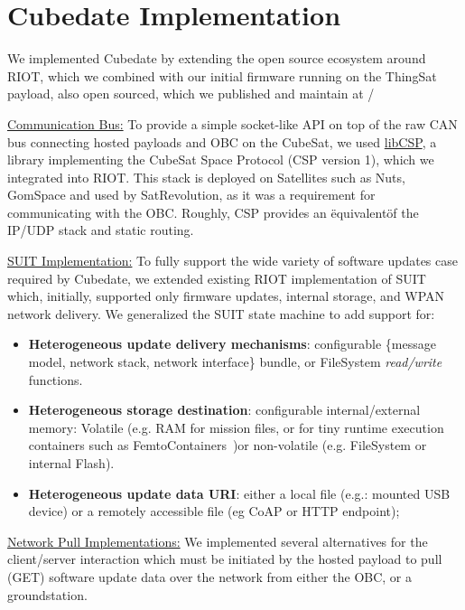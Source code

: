 \section{Cubedate Implementation}
\label{sec:implementation}

We implemented Cubedate by extending the open source ecosystem around RIOT, which we combined with
our initial firmware running on the ThingSat payload, also open sourced, which we published and
maintain at \cite*{git:cubedate-repo}/

\underline{Communication Bus:}
To provide a simple socket-like API on top of the raw CAN bus connecting hosted
payloads and OBC on the CubeSat, we used \href{https://github.com/libcsp/libcsp}{libCSP},
a library implementing the CubeSat Space Protocol (CSP version 1), which we integrated into RIOT.
This stack is deployed on Satellites such as Nuts\cite{birkeland2014nutsoverview}, GomSpace
and used by SatRevolution, as it was a requirement for communicating with the OBC.
Roughly, CSP provides an \"equivalent\" of the IP/UDP stack and static routing.

\underline{SUIT Implementation:}
To fully support the wide variety of software updates case required by Cubedate, we
extended existing RIOT implementation of SUIT~\cite{zandberg2019secure} which,
initially, supported only firmware updates, internal storage, and WPAN network delivery.
We generalized the SUIT state machine to add support for:

\begin{itemize}
    \item \textbf{Heterogeneous update delivery mechanisms}: configurable \{message model,
    network stack, network interface\} bundle, or FileSystem \textit{read/write} functions.
    \item \textbf{Heterogeneous storage destination}: configurable internal/external memory:
    Volatile (e.g. RAM for mission files, or for tiny runtime execution containers such as
    FemtoContainers~\cite{zandberg2021femto})or non-volatile (e.g. FileSystem or internal Flash).
    \item \textbf{Heterogeneous update data URI}: either a local file (e.g.: mounted USB device)
    or a remotely accessible file (eg CoAP or HTTP endpoint);
\end{itemize}

\underline{Network Pull Implementations:}
We implemented several alternatives for the client/server interaction which
must be initiated by the hosted payload to pull (GET) software update data over the
network from either the OBC, or a groundstation.

